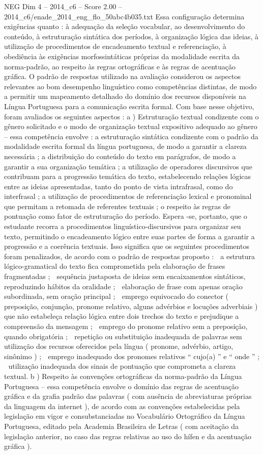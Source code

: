\begin{textsample}{NEG Dim 4 – 2014\_c6 – Score 2.00 – 2014\_c6/enade\_2014\_eng\_flo\_50abc4b035.txt}
Essa configuração determina exigências quanto : à adequação da seleção vocabular, ao desenvolvimento do conteúdo, à estruturação sintática dos períodos, à organização lógica das ideias, à utilização de procedimentos de encadeamento textual e referenciação, à obediência às exigências morfossintáticas próprias da modalidade escrita da norma-padrão, ao respeito às regras ortográficas e às regras de acentuação gráfica.
O padrão de respostas utilizado na avaliação considerou os aspectos relevantes ao bom desempenho linguístico como competências distintas, de modo a permitir um mapeamento detalhado do domínio dos recursos disponíveis na Língua Portuguesa para a comunicação escrita formal.
Com base nesse objetivo, foram avaliados os seguintes aspectos : a ) Estruturação textual condizente com o gênero solicitado e o modo de organização textual expositivo adequado ao gênero – essa competência envolve : a estruturação sintática condizente com o padrão da modalidade escrita formal da língua portuguesa, de modo a garantir a clareza necessária ; a distribuição do conteúdo do texto em parágrafos, de modo a garantir a sua organização temática ; a utilização de operadores discursivos que contribuam para a progressão temática do texto, estabelecendo relações lógicas entre as ideias apresentadas, tanto do ponto de vista intrafrasal, como do interfrasal ; a utilização de procedimentos de referenciação lexical e pronominal que permitam a retomada de referentes textuais ; o respeito às regras de pontuação como fator de estruturação do período.
Espera -se, portanto, que o estudante recorra a procedimentos linguístico-discursivos para organizar seu texto, permitindo o encadeamento lógico entre suas partes de forma a garantir a progressão e a coerência textuais.
Isso significa que os seguintes procedimentos foram penalizados, de acordo com o padrão de respostas proposto :  a estrutura lógico-gramatical do texto fica comprometida pela elaboração de frases fragmentadas ;  sequência justaposta de ideias sem encaixamentos sintáticos, reproduzindo hábitos da oralidade ;  elaboração de frase com apenas oração subordinada, sem oração principal ;  emprego equivocado do conector ( preposição, conjunção, pronome relativo, alguns advérbios e locuções adverbiais ) que não estabeleça relação lógica entre dois trechos do texto e prejudique a compreensão da mensagem ;  emprego do pronome relativo sem a preposição, quando obrigatória ;  repetição ou substituição inadequada de palavras sem utilização dos recursos oferecidos pela língua ( pronome, advérbio, artigo, sinônimo ) ;  emprego inadequado dos pronomes relativos “ cujo(a) ” e “ onde ” ;  utilização inadequada dos sinais de pontuação que comprometa a clareza textual. b ) Respeito às convenções ortográficas da norma-padrão da Língua Portuguesa – essa competência envolve o domínio das regras de acentuação gráfica e da grafia padrão das palavras ( com ausência de abreviaturas próprias da linguagem da internet ), de acordo com as convenções estabelecidas pela legislação em vigor e consubstanciadas no Vocabulário Ortográfico da Língua Portuguesa, editado pela Academia Brasileira de Letras ( com aceitação da legislação anterior, no caso das regras relativas ao uso do hífen e da acentuação gráfica ).

\end{textsample}
